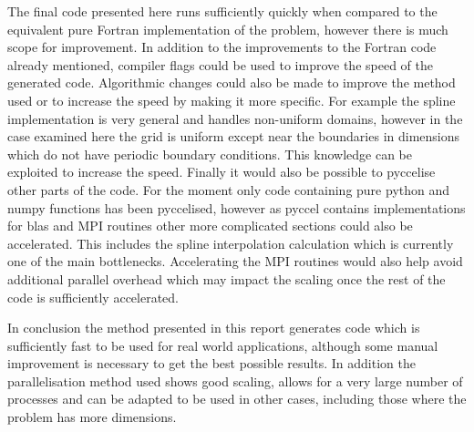 The final code presented here runs sufficiently quickly when compared to the equivalent pure Fortran implementation of the problem, however there is much scope for improvement. In addition to the improvements to the Fortran code already mentioned, compiler flags could be used to improve the speed of the generated code. Algorithmic changes could also be made to improve the method used or to increase the speed by making it more specific. For example the spline implementation is very general and handles non-uniform domains, however in the case examined here the grid is uniform except near the boundaries in dimensions which do not have periodic boundary conditions. This knowledge can be exploited to increase the speed. Finally it would also be possible to pyccelise other parts of the code. For the moment only code containing pure python and numpy functions has been pyccelised, however as pyccel contains implementations for blas and MPI routines other more complicated sections could also be accelerated. This includes the spline interpolation calculation which is currently one of the main bottlenecks. Accelerating the MPI routines would also help avoid additional parallel overhead which may impact the scaling once the rest of the code is sufficiently accelerated.

In conclusion the method presented in this report generates code which is sufficiently fast to be used for real world applications, although some manual improvement is necessary to get the best possible results. In addition the parallelisation method used shows good scaling, allows for a very large number of processes and can be adapted to be used in other cases, including those where the problem has more dimensions.

